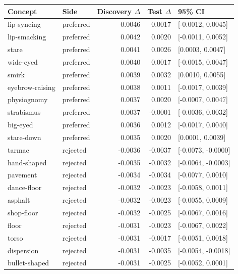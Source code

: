 \begin{tabular}{llrrl}
\toprule
Concept & Side & Discovery $\Delta$ & Test $\Delta$ & 95\% CI \\
\midrule
lip-syncing & preferred & 0.0046 & 0.0017 & [-0.0012, 0.0045] \\
lip-smacking & preferred & 0.0042 & 0.0020 & [-0.0011, 0.0052] \\
stare & preferred & 0.0041 & 0.0026 & [0.0003, 0.0047] \\
wide-eyed & preferred & 0.0040 & 0.0017 & [-0.0015, 0.0047] \\
smirk & preferred & 0.0039 & 0.0032 & [0.0010, 0.0055] \\
eyebrow-raising & preferred & 0.0038 & 0.0011 & [-0.0017, 0.0039] \\
physiognomy & preferred & 0.0037 & 0.0020 & [-0.0007, 0.0047] \\
strabismus & preferred & 0.0037 & -0.0001 & [-0.0036, 0.0032] \\
big-eyed & preferred & 0.0036 & 0.0012 & [-0.0017, 0.0040] \\
stare-down & preferred & 0.0035 & 0.0020 & [0.0001, 0.0039] \\
tarmac & rejected & -0.0036 & -0.0037 & [-0.0073, -0.0000] \\
hand-shaped & rejected & -0.0035 & -0.0032 & [-0.0064, -0.0003] \\
pavement & rejected & -0.0034 & -0.0034 & [-0.0077, 0.0010] \\
dance-floor & rejected & -0.0032 & -0.0023 & [-0.0058, 0.0011] \\
asphalt & rejected & -0.0032 & -0.0023 & [-0.0055, 0.0009] \\
shop-floor & rejected & -0.0032 & -0.0025 & [-0.0067, 0.0016] \\
floor & rejected & -0.0031 & -0.0023 & [-0.0067, 0.0022] \\
torso & rejected & -0.0031 & -0.0017 & [-0.0051, 0.0018] \\
dispersion & rejected & -0.0031 & -0.0035 & [-0.0054, -0.0018] \\
bullet-shaped & rejected & -0.0031 & -0.0025 & [-0.0052, 0.0001] \\
\bottomrule
\end{tabular}
